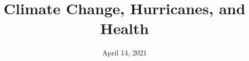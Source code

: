 \usepackage{booktabs}
\usepackage{array}
\usepackage{colortbl}
\usepackage[british]{babel}
\usepackage{graphicx,hyperref,url}
\usepackage{fontawesome}
\usepackage{hyperref}
\usepackage{adjustbox}
\usepackage{appendixnumberbeamer}
\hypersetup{colorlinks=true,allcolors=blue}

\title{Climate Change, Hurricanes, and Health}
\date{April 14, 2021}



